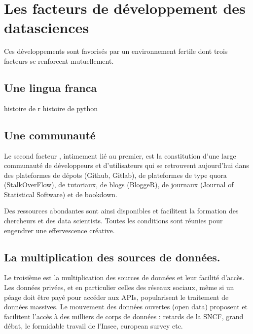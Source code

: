 \documentclass[
]{book}
\begin{document}
\hypertarget{les-facteurs-de-duxe9veloppement-des-datasciences}{%
\section{Les facteurs de développement des datasciences}\label{les-facteurs-de-duxe9veloppement-des-datasciences}}

Ces développements sont favorisés par un environnement fertile dont trois facteurs se renforcent mutuellement.

\hypertarget{une-lingua-franca}{%
\subsection{Une lingua franca}\label{une-lingua-franca}}

histoire de r
histoire de python

\hypertarget{une-communautuxe9}{%
\subsection{Une communauté}\label{une-communautuxe9}}

Le second facteur , intimement lié au premier, est la constitution d'une large communauté de développeurs et d'utilisateurs qui se retrouvent aujourd'hui dans des plateformes de dépots (Github, Gitlab), de plateformes de type quora (StalkOverFlow), de tutoriaux, de blogs (BloggeR), de journaux (Journal of Statistical Software) et de bookdown.

Des ressources abondantes sont ainsi disponibles et facilitent la formation des chercheurs et des data scientists. Toutes les conditions sont réunies pour engendrer une effervescence créative.

\hypertarget{la-multiplication-des-sources-de-donnuxe9es.}{%
\subsection{La multiplication des sources de données.}\label{la-multiplication-des-sources-de-donnuxe9es.}}

Le troisième est la multiplication des sources de données et leur facilité d'accès. Les données privées, et en particulier celles des réseaux sociaux, même si un péage doit être payé pour accéder aux APIs, popularisent le traitement de données massives. Le mouvement des données ouvertes (open data) proposent et facilitent l'accès à des milliers de corps de données : retards de la SNCF, grand débat, le formidable travail de l'Insee, european survey etc.
\end{document}
